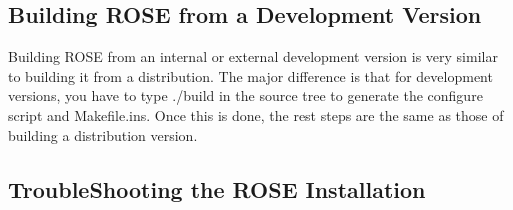 \subsection{Building ROSE from a Development Version}
Building ROSE from an internal or external development version is very
similar to building it from a distribution. The major difference is that
for development versions, you have to type ./build in the source tree to 
generate the configure script and Makefile.ins. Once this is done, the rest
steps are the same as those of building a distribution version.

\subsection{TroubleShooting the ROSE Installation}


